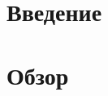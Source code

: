 \documentclass[a4paper]{article}
\begin{document}
   
\newpage

\tableofcontents
\newpage

\section{Введение}
\section{Обзор}















\end{document}
